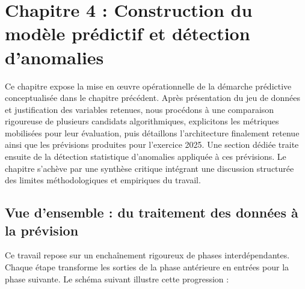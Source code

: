 ﻿
\section*{Chapitre 4 : Construction du mod\`ele pr\'edictif et d\'etection d'anomalies}

\bigskip

Ce chapitre expose la mise en \oe{}uvre op\'erationnelle de la d\'emarche pr\'edictive
conceptualis\'ee dans le chapitre pr\'ec\'edent. Apr\`es pr\'esentation du jeu de donn\'ees
et justification des variables retenues, nous proc\'edons \`a une comparaison rigoureuse
de plusieurs candidats algorithmiques, explicitons les m\'etriques mobilis\'ees pour leur
\'evaluation, puis d\'etaillons l'architecture finalement retenue ainsi que les pr\'evisions
produites pour l'exercice 2025. Une section d\'edi\'ee traite ensuite de la d\'etection
statistique d'anomalies appliqu\'ee \`a ces pr\'evisions. Le chapitre s'ach\`eve par une
synth\`ese critique int\'egrant une discussion structur\'ee des limites m\'ethodologiques
et empiriques du travail.

\subsection*{Vue d'ensemble : du traitement des données à la prévision}

Ce travail repose sur un enchaînement rigoureux de phases 
interdépendantes. Chaque étape transforme les sorties de la phase antérieure en entrées pour la phase suivante. Le schéma suivant illustre cette progression :

